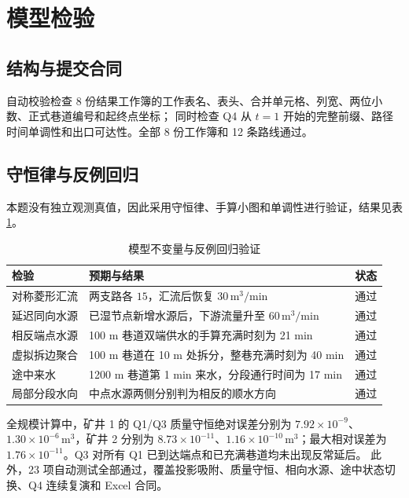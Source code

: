 \section{模型检验}

\subsection{结构与提交合同}
自动校验检查 8 份结果工作簿的工作表名、表头、合并单元格、列宽、两位小数、正式巷道编号和起终点坐标；
同时检查 Q4 从 $t=1$ 开始的完整前缀、路径时间单调性和出口可达性。全部 8 份工作簿和 12 条路线通过。

\subsection{守恒律与反例回归}
本题没有独立观测真值，因此采用守恒律、手算小图和单调性进行验证，结果见表\ref{tab:validation}。

\begin{table}[H]
\centering
\caption{模型不变量与反例回归验证}
\label{tab:validation}
\begin{tabular}{p{}p{}c}
\toprule
检验 & 预期与结果 & 状态\\
\midrule
对称菱形汇流 & 两支路各 $15$，汇流后恢复 $30\,\mathrm{m^3/min}$ & 通过\\
延迟同向水源 & 已湿节点新增水源后，下游流量升至 $60\,\mathrm{m^3/min}$ & 通过\\
相反端点水源 & 100 m 巷道双端供水的手算充满时刻为 21 min & 通过\\
虚拟拆边聚合 & 100 m 巷道在 10 m 处拆分，整巷充满时刻为 40 min & 通过\\
途中来水 & 1200 m 巷道第 1 min 来水，分段通行时间为 17 min & 通过\\
局部分段水向 & 中点水源两侧分别判为相反的顺水方向 & 通过\\
\bottomrule
\end{tabular}
\end{table}

全规模计算中，矿井 1 的 Q1/Q3 质量守恒绝对误差分别为
$7.92\times10^{-9}$、$1.30\times10^{-6}\,\mathrm{m^3}$，矿井 2 分别为
$8.73\times10^{-11}$、$1.16\times10^{-10}\,\mathrm{m^3}$；最大相对误差为
$1.76\times10^{-11}$。Q3 对所有 Q1 已到达端点和已充满巷道均未出现反常延后。
此外，23 项自动测试全部通过，覆盖投影吸附、质量守恒、相向水源、途中状态切换、Q4 连续复演和 Excel 合同。
